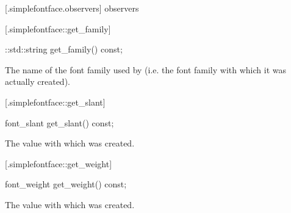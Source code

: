  [\iotwod.simplefontface.observers] { observers}

 [\iotwod.simplefontface::get_family] 
{}

%
%
\begin{itemdecl}
::std::string get_family() const;
\end{itemdecl}
\begin{itemdescr}
	\pnum
	\returns
	The name of the font family used by  (i.e. the font family 
	with which it was actually created).
\end{itemdescr}

 [\iotwod.simplefontface::get_slant] {}

%
%
\begin{itemdecl}
font_slant get_slant() const;
\end{itemdecl}
\begin{itemdescr}
	\pnum
	\returns
	The  value with which  was created.
\end{itemdescr}

 [\iotwod.simplefontface::get_weight] 
{}

%
%
\begin{itemdecl}
font_weight get_weight() const;
\end{itemdecl}
\begin{itemdescr}
	\pnum
	\returns
	The  value with which  was created.
\end{itemdescr}
